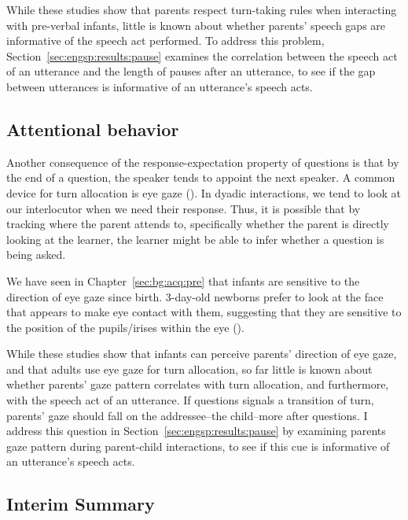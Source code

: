 While these studies show that parents respect turn-taking rules when interacting with pre-verbal infants, little is known about whether parents' speech gaps are informative of the speech act performed. To address this problem, Section~\ref{sec:engsp:results:pause} examines the correlation between the speech act of an utterance and the length of pauses after an utterance, to see if the gap between utterances is informative of an utterance's speech acts. 

\subsection{Attentional behavior}
\label{sec:engsp:bg:gaze}

Another consequence of the response-expectation property of questions is that by the end of a question, the speaker tends to appoint the next speaker. A common device for turn allocation is eye gaze (\citealt{argyle1972gaze, kendon1967gaze,duncan1979gaze, rossano2009gaze, csibra2010}). In dyadic interactions, we tend to look at our interlocutor when we need their response. Thus, it is possible that by tracking where the parent attends to, specifically whether the parent is directly looking at the learner, the learner might be able to infer whether a question is being asked. 

We have seen in Chapter~\ref{sec:bg:acq:pre} that infants are sensitive to the direction of eye gaze since birth. 3-day-old newborns prefer to look at the face that appears to make eye contact with them, suggesting that they are sensitive to the position of the pupils/irises within the eye (\cite{farroni2004gaze}).


While these studies show that infants can perceive parents' direction of eye gaze, and that adults use eye gaze for turn allocation, so far little is known about whether parents' gaze pattern correlates with turn allocation, and furthermore, with the speech act of an utterance. If questions signals a transition of turn, parents' gaze should fall on the addressee--the child--more after questions. I address this question in Section~\ref{sec:engsp:results:pause} by examining parents gaze pattern during parent-child interactions, to see if this cue is informative of an utterance's speech acts.

\subsection{Interim Summary}
\label{sec:engsp:bg:summary}

